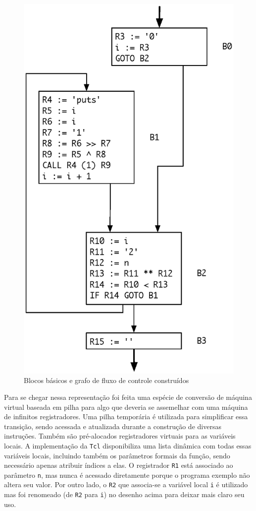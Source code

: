 \begin{figure}[h]
  \centering
  \includegraphics[scale=0.68]{bbs}
  \caption{Blocos básicos e grafo de fluxo de controle construídos \label{bbs}}
\end{figure}

Para se chegar nessa representação foi feita uma espécie de conversão de
máquina virtual baseada em pilha para algo que deveria se assemelhar
com uma máquina de infinitos registradores. Uma pilha temporária é
utilizada para simplificar essa transição, sendo acessada e atualizada
durante a construção de diversas instruções. Também são pré-alocados
registradores virtuais para as variáveis locais. A implementação da
\texttt{Tcl} disponibiliza uma lista dinâmica com todas essas
variáveis locais, incluindo também os parâmetros formais da função,
sendo necessário apenas atribuir índices a elas. O registrador
\verb!R1! está associado ao parâmetro \verb!n!, mas nunca é acessado
diretamente porque o programa exemplo não altera seu valor. Por outro
lado, o \verb!R2! que associa-se a variável local \verb!i! é utilizado
mas foi renomeado (de \verb!R2! para \verb!i!) no desenho acima para
deixar mais claro seu uso.

